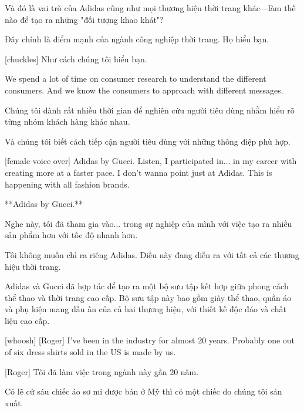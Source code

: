 \documentclass[a4paper]{article}
\begin{document}
	\begin{vietnamese-v2}
		
		Và đó là vai trò của Adidas cũng như mọi thương hiệu thời trang khác—làm thế nào để tạo ra những "đối tượng khao khát"?
		
		Đây chính là điểm mạnh của ngành công nghiệp thời trang. Họ hiểu bạn.
		
		[chuckles] Như cách chúng tôi hiểu bạn.
	\end{vietnamese-v2}
	
	We spend a lot of time on consumer research to understand the different consumers.
	And we know the consumers to approach with different messages.
	
	\begin{vietnamese-v2}
		Chúng tôi dành rất nhiều thời gian để nghiên cứu người tiêu dùng nhằm hiểu rõ từng nhóm khách hàng khác nhau.  
		
		Và chúng tôi biết cách tiếp cận người tiêu dùng với những thông điệp phù hợp.
	\end{vietnamese-v2}
	
	
	[female voice over] Adidas by Gucci.
	Listen, I participated in... in my career with creating more at a faster pace.
	I don't wanna point just at Adidas. This is happening with all fashion brands.
	
	\begin{vietnamese-v2}
		[giọng nữ] **Adidas by Gucci.**  
		
		Nghe này, tôi đã tham gia vào... trong sự nghiệp của mình với việc tạo ra nhiều sản phẩm hơn với tốc độ nhanh hơn.  
		
		Tôi không muốn chỉ ra riêng Adidas. Điều này đang diễn ra với tất cả các thương hiệu thời trang.  
		
		Adidas và Gucci đã hợp tác để tạo ra một bộ sưu tập kết hợp giữa phong cách thể thao và thời trang cao cấp. Bộ sưu tập này bao gồm giày thể thao, quần áo và phụ kiện mang dấu ấn của cả hai thương hiệu, với thiết kế độc đáo và chất liệu cao cấp.
	\end{vietnamese-v2}
	
	[whoosh]
	[Roger] I've been in the industry for almost 20 years.
	Probably one out of six dress shirts sold in the US is made by us.
	
	\begin{vietnamese-v2}
		
		[Roger] Tôi đã làm việc trong ngành này gần 20 năm.  
		
		Có lẽ cứ sáu chiếc áo sơ mi được bán ở Mỹ thì có một chiếc do chúng tôi sản xuất.  
	\end{vietnamese-v2}
	
\end{document}
